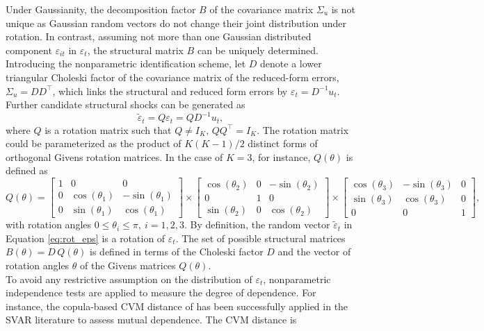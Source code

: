 \documentclass[nojss]{jss}\usepackage[]{graphicx}\usepackage[]{color}
\begin{document}
Under Gaussianity, the decomposition factor $B$ of the covariance matrix $\Sigma_u$ is not unique as Gaussian random vectors do not change their joint distribution under rotation. In contrast, assuming not more than one Gaussian distributed component $\varepsilon_{it}$ in $\varepsilon_{t}$, the structural matrix $B$ can be uniquely determined. Introducing the nonparametric identification scheme, let $D$ denote a lower triangular Choleski factor of the covariance matrix of the reduced-form errors, $\Sigma_u = DD^\top$, which links the structural and reduced form errors by $\varepsilon_t = D^{-1}u_t$. Further candidate structural shocks can be generated as
\begin{equation}
\tilde{\varepsilon}_t = Q\varepsilon_t = QD^{-1}u_t,\label{eq:rot_eps}
\end{equation}
where $Q$ is a rotation matrix such that $Q\ne I_K,\,QQ^\top=I_K$. The rotation matrix could be parameterized as the product of $K(K-1)/2$ distinct forms of orthogonal Givens rotation matrices. In the case of $K = 3$, for instance, $Q(\theta)$ is defined as
$$
Q(\theta) =
\begin{bmatrix}
1 & 0 & 0 \\
0 & \cos(\theta_1) & -\sin(\theta_1) \\
0 & \sin(\theta_1) & \cos(\theta_1)
\end{bmatrix}
\times
\begin{bmatrix}
\cos(\theta_2) & 0 & -\sin(\theta_2) \\
0 & 1 & 0 \\
\sin(\theta_2) & 0 & \cos(\theta_2)
\end{bmatrix}
\times
\begin{bmatrix}
\cos(\theta_3) & -\sin(\theta_3) & 0 \\
\sin(\theta_3) & \cos(\theta_3) & 0 \\
0 & 0 & 1
\end{bmatrix},
$$
with  rotation angles $0 \leq \theta_i \leq \pi, \: i = 1,2,3$. By definition, the random vector $\tilde{\varepsilon}_t$ in Equation \ref{eq:rot_eps}  is a rotation of $\varepsilon_t$. The set of possible structural matrices $B(\theta)=D\,Q(\theta)$ is defined in terms of the Choleski factor $D$ and the vector of rotation angles $\theta$ of the Givens matrices $Q(\theta)$.\\
To avoid any restrictive assumption on the distribution of $\varepsilon_t$, nonparametric independence tests are applied to measure the degree of dependence. For instance, the copula-based CVM distance of \cite{Genest2007} has been successfully applied in the  SVAR literature \citep{HerwartPloedt2016II, HerwartzLDI2018} to assess mutual dependence. The CVM distance is
\end{document}
